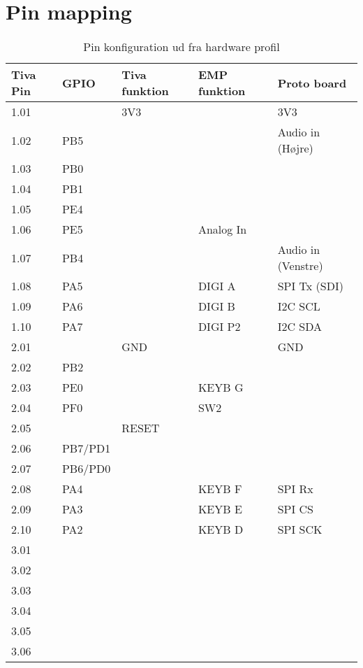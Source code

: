 \chapter{Pin mapping} \label{bilag:pinmap}

\begin{table}[h!]
	\caption{Pin konfiguration ud fra hardware profil}
	\label{tab:ordliste}
	\begin{threeparttable}
		\begin{tabular}{l l l l l}
			\toprule
			\textbf{Tiva Pin}   & 
			\textbf{GPIO}  &
			\textbf{Tiva funktion\tnote{a}} & 
			\textbf{EMP funktion}  &
			\textbf{Proto board}	   \\ 
			\midrule
			1.01 &      & 3V3  &   &  3V3  \\
			1.02 &  PB5 &      &   &  Audio in (Højre)\\
			1.03 &	PB0 &		&	&	\\
			1.04 &	PB1 &		&	&	\\
			1.05 &	PE4 &		&	&	\\
			1.06 &	PE5 &		& Analog In	&	\\
			1.07 &	PB4 &		&			& Audio in (Venstre)	\\
			1.08 &	PA5 &		& DIGI A	& SPI Tx (SDI)	\\
			1.09 &	PA6 &		& DIGI B    & I2C SCL	\\
			1.10 &	PA7 &		& DIGI P2	& I2C SDA	\\
			\midrule
			2.01 &     & GND  &   &  GND  \\
			2.02 & PB2 &      &   &  \\
			2.03 & PE0 &	  & KEYB G &	\\
			2.04 & PF0 &	  & SW2	&	\\
			2.05 &     & RESET		&	& \\
			2.06 & PB7/PD1    & 	& 	& \\
			2.07 & PB6/PD0    &		&	& \\
			2.08 & PA4   &      & KEYB F & SPI Rx	\\
			2.09 & PA3   &		& KEYB E    & SPI CS	\\
			2.10 & PA2   &		& KEYB D	& SPI SCK	\\
			\midrule
			3.01 &		&		&		&		\\
			3.02 &		&		&		&		\\
			3.03 &		&		&		&		\\
			3.04 &		&		&		&		\\
			3.05 &		&		&		&		\\
			3.06 &		&		&		&		\\

\end{tabular}
\end{threeparttable}
\end{table}
